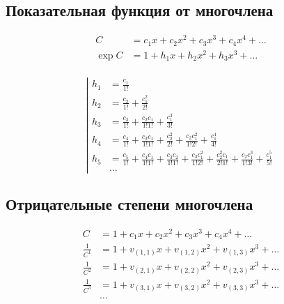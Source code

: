 \subsection{Показательная функция от многочлена}

\begin{equation*}
\begin{aligned}
C &= c_1 x + c_2 x^2 + c_3 x^3 + c_4 x^4 + \ldots \\
\exp{C} &= 1 + h_1 x + h_2 x^2 + h_3 x^3 + \ldots \\
\end{aligned}
\end{equation*}

\begin{equation*}
\left|
\begin{aligned} 
h_1 
&= \frac{c_1}{1!} \\ 
h_2 
&= \frac{c_2}{1!} 
+ \frac{c_1^2}{2!} \\
h_3 
&= \frac{c_3}{1!} 
+ \frac{c_2 c_1}{1!1!} 
+ \frac{c_1^3}{3!} \\
h_4 
&= \frac{c_4}{1!} 
+ \frac{c_3 c_1}{1!1!} 
+ \frac{c_2^2}{2!} 
+ \frac{c_2 c_1^2}{1!2!} 
+ \frac{c_1^4}{4!} \\
h_5
&= \frac{c_5}{1!}
+ \frac{c_4 c_1}{1!1!}
+ \frac{c_3 c_2}{1!1!}
+ \frac{c_3 c_1^2}{1!2!}
+ \frac{c_2^2 c_1}{2!1!}
+ \frac{c_2 c_1^3}{1!3!}
+ \frac{c_1^5}{5!} \\
&\ldots
\end{aligned}
\right.
\end{equation*}

\subsection{Отрицательные степени многочлена}

\begin{equation*}
\begin{aligned}
C &= 1 + c_1 x + c_2 x^2 + c_3 x^3 + c_4 x^4 + \ldots \\
\frac{1}{C^1} &= 1 + v_{(1,1)} x + v_{(1,2)} x^2 + v_{(1,3)} x^3 + \ldots 	\\ 
\frac{1}{C^2} &= 1 + v_{(2,1)} x + v_{(2,2)} x^2 + v_{(2,3)} x^3 + \ldots 	\\
\frac{1}{C^3} &= 1 + v_{(3,1)} x + v_{(3,2)} x^2 + v_{(3,3)} x^3 + \ldots 	\\ 
&\dots
\end{aligned}
\end{equation*}

